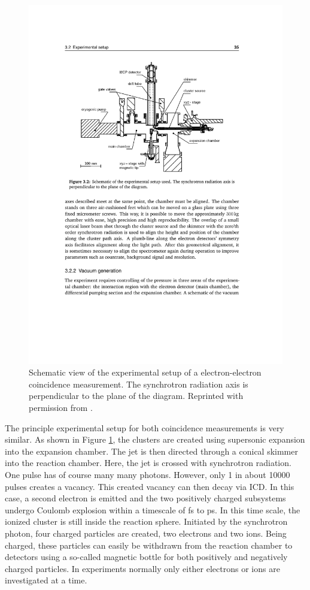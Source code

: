 \begin{figure}[h]
  \centering
  \includegraphics[]{pics/exp_setup_overview.pdf}
  \caption{Schematic view of the experimental setup of a electron-electron
           coincidence measurement. The synchrotron radiation axis
           is perpendicular to the plane of the diagram.
           Reprinted with permission from \cite{PhDFoerstel}. }
  \label{figure:exp_setup_overview}
\end{figure}

The principle experimental setup for both coincidence measurements is very similar.
As shown in Figure \ref{figure:exp_setup_overview},
the clusters are created using supersonic expansion into
the expansion chamber. The jet is then directed through a conical skimmer
into the reaction chamber. Here, 
the jet is crossed with synchrotron radiation.
One pulse has of course many many photons. However, only 1 in about 10000
pulses creates a vacancy.
This created vacancy can then decay via ICD.
In this case, a second electron is emitted and the two positively charged
subsystems undergo
Coulomb explosion within a timescale of \unit{fs} to \unit[]{ps}.
In this time scale, the ionized cluster is still inside the reaction sphere.
Initiated by the synchrotron photon, four charged particles are created,
two electrons and two ions.
Being charged, these particles can easily be withdrawn from the reaction
chamber to detectors using a so-called magnetic bottle for both positively
and negatively charged particles. In experiments normally only either electrons
or ions are investigated at a time.

